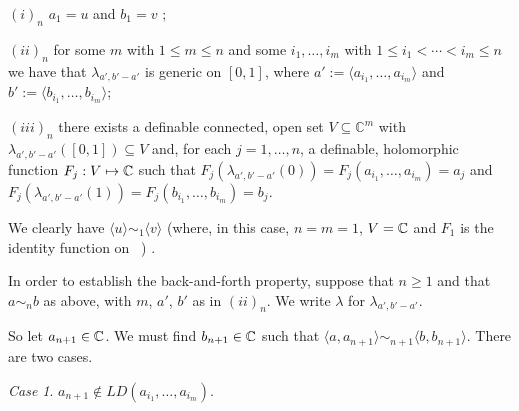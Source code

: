 \documentclass[12pt,nodate]{article}
\begin{document}
 \noindent
 $(i)_n$ $ a_1 = u$ and $b_1 = v$ ;

\vspace{2mm}

\noindent
$(ii)_n$ for some $m$ with $1 \leq m \leq n$ and some $i_1 , \ldots , i_m$ with $1 \leq i_1 < \cdots < i_m \leq n$ we have that $\lambda_{a' , b'-a'}$ is generic on $[0, 1]$, where $a' := \langle a_{i_1} , \ldots , a_{i_m} \rangle$
 and  $b' := \langle b_{i_1} , \ldots , b_{i_m} \rangle$;
 
\vspace{2mm}

\noindent
$(iii)_n$ there exists a definable connected, open set $V \subseteq \mathbb{C}^{m}$ with $\lambda_{a' , b'-a'}([0, 1]) \subseteq V$ and, for each $j = 1, \ldots , n$, a definable, holomorphic function $F_j : V \mapsto \mathbb{C}$ such that
\hspace{2mm} $F_j (\lambda_{a' , b'-a'}(0)) =F_j (a_{i_1} , \ldots , a_{i_m}) = a_j$ and 
\hspace{2mm} $F_j (\lambda_{a' , b'-a'}(1)) =F_j (b_{i_1} , \ldots , b_{i_m}) = b_j$.

\vspace{3mm}

We clearly have $\langle u \rangle \sim_1 \langle v \rangle$ (where, in this case, $n = m = 1$, $V = \mathbb{C}$ and $F_1$ is the identity function on \C\ ) .

\vspace{3mm}

In order to establish the back-and-forth property, suppose that $n \geq 1$ and that $a \sim_n b$ as above, with $m$, $a'$, $b'$ as in $(ii)_n$. We write $\lambda$ for $\lambda_{a', b'-a'}$.

\vspace{3mm}

So let $a_{n+1} \in \mathbb{C}$. We must find $b_{n+1} \in \mathbb{C}$ such that $\langle a, a_{n+1} \rangle \sim_{n+1} \langle b, b_{n+1} \rangle$. There are two cases.

\vspace{3mm}

\noindent
\emph{Case 1}. $a_{n+1} \notin LD(a_{i_1} , \ldots , a_{i_m})$. 

\vspace{2mm}
\end{document}
